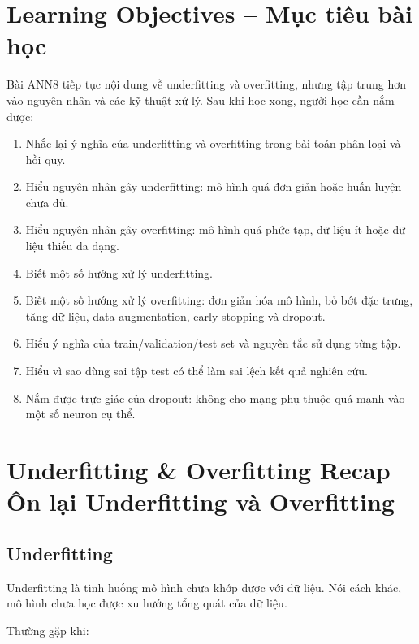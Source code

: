 

\section*{Learning Objectives -- Mục tiêu bài học}

Bài ANN8 tiếp tục nội dung về underfitting và overfitting, nhưng tập trung hơn vào nguyên nhân và các kỹ thuật xử lý. Sau khi học xong, người học cần nắm được:

\begin{enumerate}[label=\arabic*.]
    \item Nhắc lại ý nghĩa của underfitting và overfitting trong bài toán phân loại và hồi quy.
    \item Hiểu nguyên nhân gây underfitting: mô hình quá đơn giản hoặc huấn luyện chưa đủ.
    \item Hiểu nguyên nhân gây overfitting: mô hình quá phức tạp, dữ liệu ít hoặc dữ liệu thiếu đa dạng.
    \item Biết một số hướng xử lý underfitting.
    \item Biết một số hướng xử lý overfitting: đơn giản hóa mô hình, bỏ bớt đặc trưng, tăng dữ liệu, data augmentation, early stopping và dropout.
    \item Hiểu ý nghĩa của train/validation/test set và nguyên tắc sử dụng từng tập.
    \item Hiểu vì sao dùng sai tập test có thể làm sai lệch kết quả nghiên cứu.
    \item Nắm được trực giác của dropout: không cho mạng phụ thuộc quá mạnh vào một số neuron cụ thể.
\end{enumerate}

\section{Underfitting \& Overfitting Recap -- Ôn lại Underfitting và Overfitting}

\subsection{Underfitting}

Underfitting là tình huống mô hình chưa khớp được với dữ liệu. Nói cách khác, mô hình chưa học được xu hướng tổng quát của dữ liệu.

Thường gặp khi:

